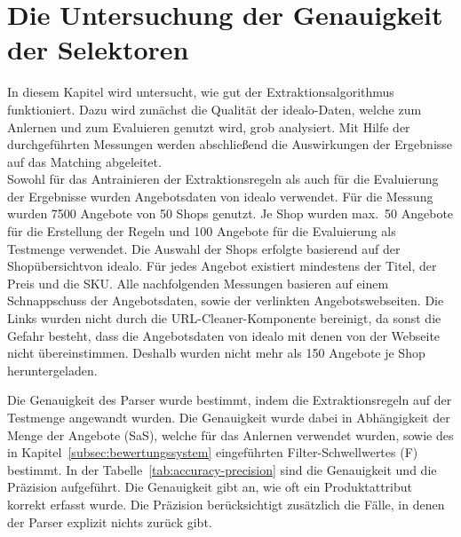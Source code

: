 \section{Die Untersuchung der Genauigkeit der Selektoren}
\label{sec:evaluierung}

In diesem Kapitel wird untersucht, wie gut der Extraktionsalgorithmus funktioniert.
Dazu wird zunächst die Qualität der idealo-Daten, welche zum Anlernen und zum Evaluieren genutzt wird, grob analysiert.
Mit Hilfe der durchgeführten Messungen werden abschließend die Auswirkungen der Ergebnisse auf das Matching
abgeleitet.\\
\newline
Sowohl für das Antrainieren der Extraktionsregeln als auch für die Evaluierung der Ergebnisse wurden Angebotsdaten
von idealo verwendet.
Für die Messung wurden 7500 Angebote von 50 Shops genutzt.
Je Shop wurden max.\ 50 Angebote für die Erstellung der Regeln und 100 Angebote für die Evaluierung als Testmenge
verwendet.
Die Auswahl der Shops erfolgte basierend auf der Shopübersicht\footnotemark von idealo.
Für jedes Angebot existiert mindestens der Titel, der Preis und die SKU.
Alle nachfolgenden Messungen basieren auf einem Schnappschuss der Angebotsdaten, sowie der verlinkten Angebotswebseiten.
Die Links wurden nicht durch die URL-Cleaner-Komponente bereinigt, da sonst die Gefahr besteht, dass die
Angebotsdaten von idealo mit denen von der Webseite nicht übereinstimmen.
Deshalb wurden nicht mehr als 150 Angebote je Shop heruntergeladen.

Die Genauigkeit des Parser wurde bestimmt, indem die Extraktionsregeln auf der Testmenge angewandt wurden.
Die Genauigkeit wurde dabei in Abhängigkeit der Menge der Angebote (SaS), welche für das Anlernen verwendet wurden,
sowie des in Kapitel~\ref{subsec:bewertungssystem} eingeführten Filter-Schwellwertes (F) bestimmt.
In der Tabelle~\ref{tab:accuracy-precision} sind die Genauigkeit und die Präzision aufgeführt.
Die Genauigkeit gibt an, wie oft ein Produktattribut korrekt erfasst wurde.
Die Präzision berücksichtigt zusätzlich die Fälle, in denen der Parser explizit nichts zurück gibt.

